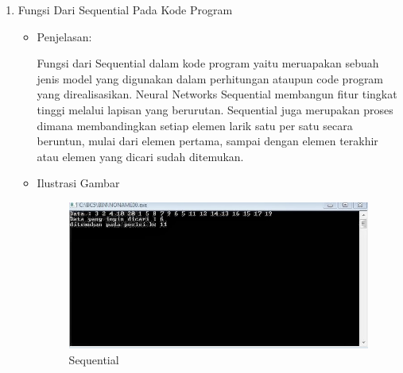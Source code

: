\begin{enumerate}
\item Fungsi Dari Sequential Pada Kode Program
\begin{itemize}
\item Penjelasan:
\par Fungsi dari Sequential dalam kode program yaitu meruapakan sebuah jenis model yang digunakan dalam perhitungan ataupun code program yang direalisasikan. Neural Networks Sequential membangun fitur tingkat tinggi melalui lapisan yang berurutan. Sequential juga merupakan proses dimana membandingkan setiap elemen larik satu per satu secara beruntun, mulai dari elemen pertama, sampai dengan elemen terakhir atau elemen yang dicari sudah ditemukan.
\item Ilustrasi Gambar
\begin{figure}[!hbtp]
\centering
\includegraphics[scale=0.8]{figures/andi/68.jpg}
\caption{Sequential}
\label{Contoh 8}
\end{figure}
\end{itemize}

\end{enumerate}






